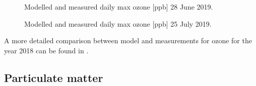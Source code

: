 \begin{figure}[H]
\caption{Modelled and measured daily max ozone [ppb] 28 June 2019.}
\label{fig:O3_20190628}
\end{figure}


\begin{figure}[H]
\caption{Modelled and measured daily max ozone [ppb] 25 July 2019.}
\label{fig:O3_20190725}
\end{figure}


A more detailed comparison between model and measurements for ozone for the year 2018 can be found in \cite{WEB2020:O3}.



\subsection{Particulate matter} 
\label{subs:PMstatus}

